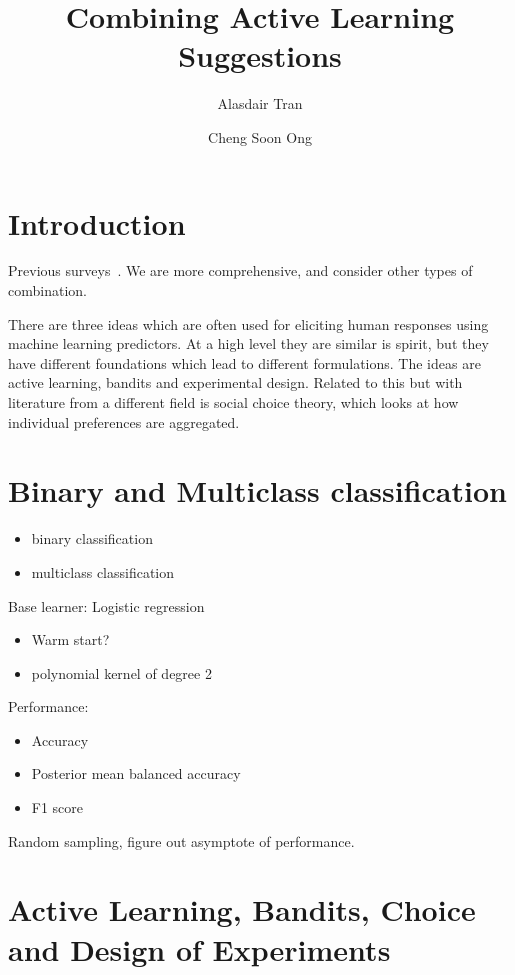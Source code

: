 \documentclass[fleqn,10pt,lineno]{wlpeerj} %
\title{Combining Active Learning Suggestions}
\author[1]{Alasdair Tran}
\author[2]{Cheng Soon Ong}
\affil[1]{}
\affil[2]{Machine Learning Research Group, Data61, CSIRO, Australia}
\begin{document}
\flushbottom
\maketitle
\thispagestyle{empty}

\section*{Introduction}


Previous surveys~\cite{baram04onlcal,hsu15actll}. We are more comprehensive, and consider other types of combination.

There are three ideas which are often used for eliciting human
responses using machine learning predictors. At a high level they are
similar is spirit, but they have different foundations which lead to
different formulations. The ideas are active learning, bandits and
experimental design. Related to this but with literature from a different field is social choice theory, which looks at how individual preferences are aggregated.



\section*{Binary and Multiclass classification}

\begin{itemize}
  \item binary classification
  \item multiclass classification
\end{itemize}

Base learner: Logistic regression
\begin{itemize}
  \item Warm start?
  \item polynomial kernel of degree 2
\end{itemize}

Performance:
\begin{itemize}
  \item Accuracy
  \item Posterior mean balanced accuracy
  \item F1 score
\end{itemize}

Random sampling, figure out asymptote of performance.

\section*{Active Learning, Bandits, Choice and Design of Experiments}
\end{document}
